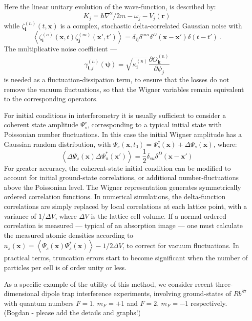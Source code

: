 \documentclass[aps,prl,twocolumn,showpacs,amsmath,amssymb,superscriptaddress]{revtex4-1}
\begin{document}
Here the linear unitary evolution of the wave-function, is described by:
\begin{equation}
	K_{j} = \hbar \nabla^{2}/2m - \omega_{j} - V_{j} \left( \mathbf{r} \right)
\end{equation}
while $\zeta_{\mathbf{i}}^{(n)}(t,\mathbf{x})$ is a complex,
stochastic delta-correlated Gaussian noise with
\begin{equation}
	\left\langle
		\zeta_{\mathbf{i}}^{(n)} (\mathbf{x},t) \zeta_{\mathbf{j}}^{(m)}(\mathbf{x}',t')
	\right\rangle =
	\delta_{\mathbf{ij}} \delta^{nm} \delta^{D} \left(
		\mathbf{x} - \mathbf{x}'
	\right)
	\delta \left( t - t' \right)\,.
\end{equation}
The multiplicative noise coefficient ---
\begin{equation}
	\gamma_{\mathbf{i},j}^{(n)} \left( \boldsymbol{\psi} \right) =
	\sqrt{\kappa_{\mathbf{i}}^{(n)}}
	\frac{\partial O_{\mathbf{k}}^{(n)}}{\partial\psi_{j}}
\end{equation}
is needed as a fluctuation-dissipation term,
to ensure that the losses do not remove the vacuum fluctuations,
so that the Wigner variables remain equivalent to the corresponding operators.

For initial conditions in interferometry it is usually sufficient
to consider a coherent state amplitude $\Psi_{s}^{c}$,
corresponding to a typical initial state with Poissonian number fluctuations.
In this case the initial Wigner amplitude has a Gaussian random distribution,
with $\Psi_{s}(\mathbf{x},t_{0})=\Psi_{s}^{c}(\mathbf{x})+\Delta\Psi_{s}(\mathbf{x})$,
where:
\begin{equation}
	\left\langle
		\Delta\Psi_{s}(\mathbf{x}) \Delta\Psi_{u}^{*}(\mathbf{x}')
	\right\rangle =
	\frac{1}{2} \delta_{su} \delta^{D} \left( \mathbf{x} - \mathbf{x}'\right)
\end{equation}
For greater accuracy, the coherent-state initial condition
can be modified to account for initial ground-state correlations,
or additional number-fluctuations above the Poissonian level.
The Wigner representation generates symmetrically ordered correlation functions.
In numerical simulations, the delta-function correlations are simply replaced by
local correlations at each lattice point,
with a variance of $1/\Delta V$, where $\Delta V$ is the lattice cell volume.
If a normal ordered correlation is measured --- typical of an absorption image ---
one must calculate the measured atomic densities according to
$n_{s} \left( \mathbf{x} \right) = \left\langle
	\Psi_{s}(\mathbf{x}) \Psi_{s}^{*}(\mathbf{x})
\right\rangle -1/2\Delta V$,
to correct for vacuum fluctuations.
In practical terms, truncation errors start to become significant
when the number of particles per cell is of order unity or less.

As a specific example of the utility of this method,
we consider recent three-dimensional dipole trap interference experiments,
involving ground-states of $Rb^{87}$ with quantum numbers $F=1,\, m_{F}=+1$
and $F=2,\, m_{F}=-1$ respectively.
(Bogdan - please add the details and graphs!)


\end{document}
